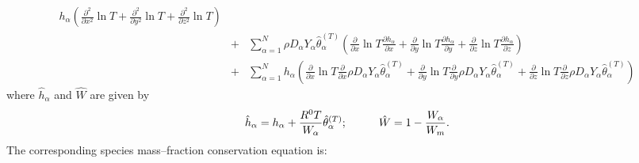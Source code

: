\documentclass[dvips]{article}
\begin{document}
\begin{eqnarray}
h_{\alpha}
\left(
 \frac{\partial^{2}}{\partial x^{2}}\ln{T}
+\frac{\partial^{2}}{\partial y^{2}}\ln{T}
+\frac{\partial^{2}}{\partial z^{2}}\ln{T}
\right)
\nonumber\\
& + & \sum_{\alpha=1}^{N}\rho D_{\alpha}Y_{\alpha}\hat{\theta}_{\alpha}^{(T)}
\left(
 \frac{\partial}{\partial x}\ln{T}\frac{\partial h_{\alpha}}{\partial x}
+\frac{\partial}{\partial y}\ln{T}\frac{\partial h_{\alpha}}{\partial y}
+\frac{\partial}{\partial z}\ln{T}\frac{\partial h_{\alpha}}{\partial z}
\right)\nonumber\\
& + & \sum_{\alpha=1}^{N}h_{\alpha}
\left(
 \frac{\partial}{\partial x}\ln{T}
 \frac{\partial}{\partial x}\rho D_{\alpha}Y_{\alpha}\hat{\theta}_{\alpha}^{(T)}
+\frac{\partial}{\partial y}\ln{T}
 \frac{\partial}{\partial y}\rho D_{\alpha}Y_{\alpha}\hat{\theta}_{\alpha}^{(T)}
+\frac{\partial}{\partial z}\ln{T}
 \frac{\partial}{\partial z}\rho D_{\alpha}Y_{\alpha}\hat{\theta}_{\alpha}^{(T)}
\right)
\label{EENERGYMAV}
\end{eqnarray}
where $\hat{h}_{\alpha}$ and $\hat{W}$ are given by
\begin{equation}
\hat{h}_{\alpha} = h_{\alpha}
+ \frac{R^{0}T}{W_{\alpha}}\hat{\theta}_{\alpha}^{(T)};\hspace{10mm} 
\hat{W} = 1-\frac{W_{\alpha}}{W_{m}}.
\end{equation}
The corresponding species mass--fraction conservation equation is:
\end{document}
